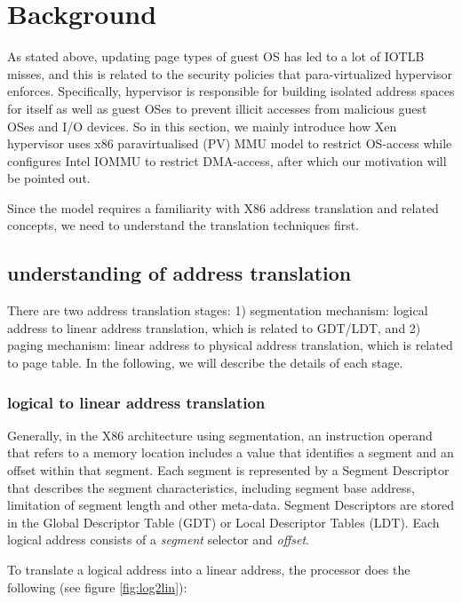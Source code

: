 \section{Background}

As stated above, updating page types of guest OS has led to a lot of IOTLB misses, and this is related to the security policies that para-virtualized hypervisor enforces. Specifically, hypervisor is responsible for building isolated address spaces for itself as well as guest OSes to prevent illicit accesses from malicious guest OSes and I/O devices. So in this section, we mainly introduce how Xen hypervisor uses x86 paravirtualised (PV) MMU model to restrict OS-access while configures Intel IOMMU to restrict DMA-access, after which our motivation will be pointed out.

Since the model requires a familiarity with X86 address translation and related concepts, we need to understand the translation techniques first.

\subsection{understanding of address translation}

There are two address translation stages: 1) segmentation mechanism: logical address to linear address translation, which is related to GDT/LDT, and 2) paging mechanism: linear address to physical address translation, which is related to page table. In the following, we will describe the details of each stage.

\subsubsection{logical to linear address translation}

Generally, in the X86 architecture using segmentation, an instruction operand that refers to a memory location includes a value that identifies a segment and an offset within that segment. Each segment is represented by a Segment Descriptor that describes the segment characteristics, including segment base address, limitation of segment length and other meta-data. Segment Descriptors are stored in the Global Descriptor Table (GDT) or Local Descriptor Tables (LDT). Each logical address consists of a \emph{segment} selector and \emph{offset}.

To translate a logical address into a linear address, the processor does the following (see figure \ref{fig:log2lin}):

